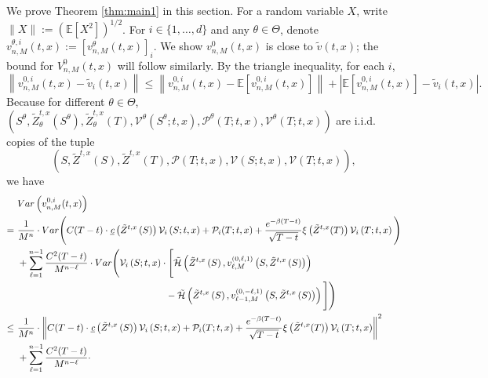 \documentclass[11pt]{article}
\theoremstyle{definition}
\theoremstyle{plain}
\newcommand{\E}{\mathbb{E}}
\newcommand{\cH}{{\cal H}}
\begin{document}
\begin{appendices}
  We prove Theorem \ref{thm:main1} in this section. 
  For a random variable $X$, write $\|X\| := (\E[X^2])^{1/2}$. For $i\in\{1,\dots,d\}$ and any $\theta\in\Theta$, denote $v^{\theta,i}_{n,M}(t,x):= [v^\theta_{n,M}(t,x)]_i$. 
  We show $v^0_{n,M}(t,x)$ is close to $\tilde v(t,x)$; the bound for $V^0_{n,M}(t,x)$ will follow similarly.
  By the triangle inequality, for each $i$,
  \begin{equation}
  \left\|v^{0,i}_{n,M}(t,x) - \tilde{v}_i(t,x)\right\| \leq 
  \left\|v^{0,i}_{n,M}(t,x) - \E\left[v^{0,i}_{n,M}(t,x)\right]\right\| + \left|\E\left[v^{0,i}_{n,M}(t,x)\right] - \tilde{v}_i(t,x)\right|.
  \end{equation}
  Because for different $\theta\in\Theta$, $\left(S^\theta, \tilde{Z}^{t,x}_\theta(S^\theta), \tilde{Z}^{t,x}_\theta(T), \mathcal{V}^\theta(S^\theta; t,x), \mathcal{P}^\theta(T; t,x), \mathcal{V}^\theta(T; t,x) \right)$
  are i.i.d. copies of the tuple
  \[  
  \left(S, \tilde{Z}^{t,x}(S), \tilde{Z}^{t,x}(T), \mathcal{P}(T; t,x), \mathcal{V}(S; t,x), \mathcal{V}(T; t,x)\right),
  \] we have
  \begin{align*}
  &~ Var\left(v^{0,i}_{n,M}(t,x)\right) \\
  =&~\frac{1}{M^n} \cdot Var\Bigg(C(T-t) \cdot \underbar{\em c}\left(\tilde{Z}^{t,x}\left(S\right)\right) \mathcal{V}_i\left(S; t,x\right) + \mathcal{P}_i(T; t,x) + \frac{e^{-\beta (T-t)}}{\sqrt{T-t}}\xi\left(\tilde{Z}^{t,x}(T)\right) \mathcal{V}_i\left(T; t,x\right)\Bigg) \\
  &~+ \sum_{\ell=1}^{n-1} \frac{C^2(T-t)}{M^{n-\ell}} \cdot 
  Var \Bigg( \mathcal{V}_i\left(S; t,x\right)\cdot 
  \Bigg[\tilde \cH\left(\tilde{Z}^{t,x}\left(S\right), v^{(0, \ell, 1)}_{\ell, M}\left(S, \tilde{Z}^{t,x}\left(S\right)\right) \right) \\
  & \qquad \qquad \qquad \qquad \qquad \qquad \qquad \qquad 
  - \tilde \cH\left(\tilde{Z}^{t,x}\left(S\right), v^{(0, -\ell, 1)}_{\ell-1, M}\left(S, \tilde{Z}^{t,x}\left(S\right)\right) \right)\Bigg]\Bigg) \\
  \leq &~ \frac{1}{M^n} \cdot \left\|C(T-t) \cdot \underbar{\em c}\left(\tilde{Z}^{t,x}\left(S\right)\right) \mathcal{V}_i\left(S; t,x\right)
  + \mathcal{P}_i(T; t,x) + \frac{e^{-\beta (T-t)}}{\sqrt{T-t}}\xi\left(\tilde{Z}^{t,x}(T)\right) \mathcal{V}_i\left(T; t,x\right)\right\|^2 \\
  &~ + \sum_{\ell=1}^{n-1} \frac{C^2(T-t)}{M^{n-\ell}} \cdot 

\end{align*}
\end{appendices}
\end{document}
